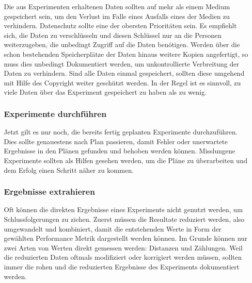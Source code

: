     Die aus Experimenten erhaltenen Daten sollten auf mehr als einem Medium gespeichert sein, um 
    den Verlust im Falle eines Ausfalls eines der Medien zu verhindern. Datenschutz sollte eine der 
    obersten Prioritäten sein. Es empfiehlt sich, die Daten zu verschlüsseln und diesen Schlüssel 
    nur an die Personen weiterzugeben, die unbedingt Zugriff auf die Daten benötigen. Werden über 
    die schon bestehenden Speicherplätze der Daten hinaus weitere Kopien angefertigt, so muss dies 
    unbedingt Dokumentiert werden, um unkontrollierte Verbreitung der Daten zu verhindern. Sind alle 
    Daten einmal gespeichert, sollten diese umgehend mit Hilfe des Copyright weiter geschützt werden. 
    In der Regel ist es sinnvoll, zu viele Daten über das Experiment gespeichert zu haben als zu wenig. 

    \subsubsection{Experimente durchführen}

    Jetzt gilt es nur noch, die bereits fertig geplanten Experimente durchzuführen. Dies 
    sollte genauestens nach Plan passieren, damit Fehler oder unerwartete Ergebnisse in den 
    Plänen gefunden und behoben werden können. Misslungene Experimente sollten als Hilfen 
    gesehen werden, um die Pläne zu überarbeiten und dem Erfolg einen Schritt näher zu kommen.

    \subsubsection{Ergebnisse extrahieren}

    Oft können die direkten Ergebnisse eines Experiments nicht genutzt werden, um 
    Schlussfolgerungen zu ziehen. Zuerst müssen die Resultate reduziert werden, also 
    umgewandelt und kombiniert, damit die entstehenden Werte in Form der gewählten 
    Performance Metrik dargestellt werden können. Im Grunde können nur zwei Arten von 
    Werten direkt gemessen werden: Distanzen und Zählungen. Weil die reduzierten Daten oftmals 
    modifiziert oder korrigiert werden müssen, sollten immer die rohen und die reduzierten 
    Ergebnisse des Experiments dokumentiert werden.



